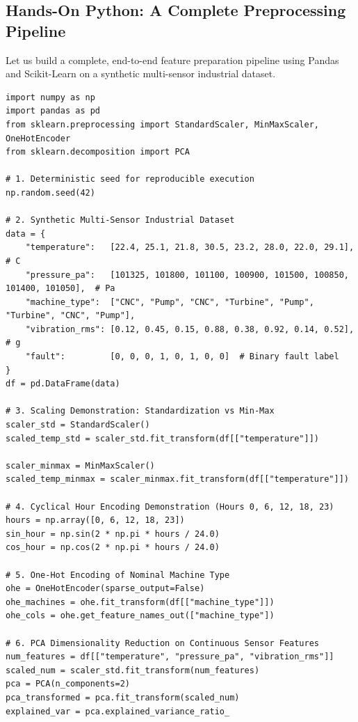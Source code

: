 \subsection{Hands-On Python: A Complete Preprocessing Pipeline}\label{subsec:feature_python}

Let us build a complete, end-to-end feature preparation pipeline using Pandas and Scikit-Learn on a synthetic multi-sensor industrial dataset.

\begin{lstlisting}[style=pythonstyle]
import numpy as np
import pandas as pd
from sklearn.preprocessing import StandardScaler, MinMaxScaler, OneHotEncoder
from sklearn.decomposition import PCA

# 1. Deterministic seed for reproducible execution
np.random.seed(42)

# 2. Synthetic Multi-Sensor Industrial Dataset
data = {
    "temperature":   [22.4, 25.1, 21.8, 30.5, 23.2, 28.0, 22.0, 29.1],  # C
    "pressure_pa":   [101325, 101800, 101100, 100900, 101500, 100850, 101400, 101050],  # Pa
    "machine_type":  ["CNC", "Pump", "CNC", "Turbine", "Pump", "Turbine", "CNC", "Pump"],
    "vibration_rms": [0.12, 0.45, 0.15, 0.88, 0.38, 0.92, 0.14, 0.52],  # g
    "fault":         [0, 0, 0, 1, 0, 1, 0, 0]  # Binary fault label
}
df = pd.DataFrame(data)

# 3. Scaling Demonstration: Standardization vs Min-Max
scaler_std = StandardScaler()
scaled_temp_std = scaler_std.fit_transform(df[["temperature"]])

scaler_minmax = MinMaxScaler()
scaled_temp_minmax = scaler_minmax.fit_transform(df[["temperature"]])

# 4. Cyclical Hour Encoding Demonstration (Hours 0, 6, 12, 18, 23)
hours = np.array([0, 6, 12, 18, 23])
sin_hour = np.sin(2 * np.pi * hours / 24.0)
cos_hour = np.cos(2 * np.pi * hours / 24.0)

# 5. One-Hot Encoding of Nominal Machine Type
ohe = OneHotEncoder(sparse_output=False)
ohe_machines = ohe.fit_transform(df[["machine_type"]])
ohe_cols = ohe.get_feature_names_out(["machine_type"])

# 6. PCA Dimensionality Reduction on Continuous Sensor Features
num_features = df[["temperature", "pressure_pa", "vibration_rms"]]
scaled_num = scaler_std.fit_transform(num_features)
pca = PCA(n_components=2)
pca_transformed = pca.fit_transform(scaled_num)
explained_var = pca.explained_variance_ratio_


\end{lstlisting}
